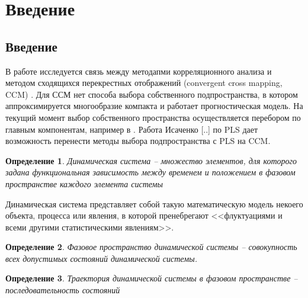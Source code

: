 \documentclass[12pt]{extarticle}
\newtheorem{definition}{Определение}
\begin{document}






\section{Введение}







\subsection{Введение}
В работе исследуется связь между методапми корреляционного анализа и методом сходящихся перекрестных отображений (convergent cross mapping, CCM) \cite{sugihara1990nonlinear, sugihara2012detecting}.
Для ССМ нет способа выбора собственного подпространства, в котором аппроксимируется многообразие компакта и работает прогностическая модель. На текущий момент выбор собственного пространства осуществляется перебором по главным компонентам, например в \cite{usmanova}. Работа Исаченко [..] по PLS дает возможность перенести методы выбора подпространства с PLS на CCM.

\begin{definition}
Динамическая система -- множество элементов, для которого задана функциональная зависимость между временем и положением в фазовом пространстве каждого элемента системы
\end{definition}
Динамическая система представляет собой такую математическую модель некоего объекта, процесса или явления, в которой пренебрегают <<флуктуациями и всеми другими статистическими явлениям>>.

\begin{definition}
Фазовое пространство динамической системы -- совокупность всех допустимых состояний динамической системы.
\end{definition}

\begin{definition}
Траектория динамической системы в фазовом пространстве -- последовательность состояний
\end{definition}
\end{document}
